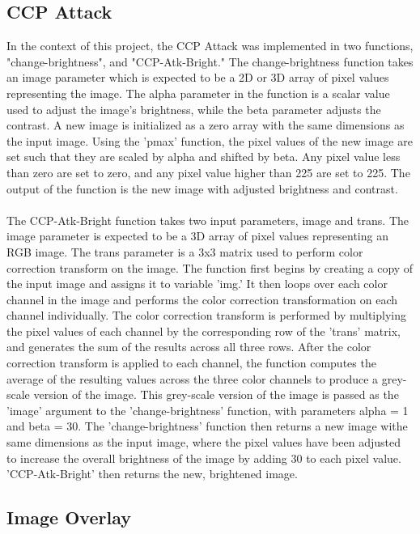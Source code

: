 \documentclass{article}
\begin{document}
\subsection{CCP Attack}
In the context of this project, the CCP Attack was implemented in two functions, "change-brightness", and "CCP-Atk-Bright." The change-brightness function takes an image parameter which is expected to be a 2D or 3D array of pixel values representing the image. The alpha parameter in the function is a scalar value used to adjust the image's brightness, while the beta parameter adjusts the contrast. A new image is initialized as a zero array with the same dimensions as the input image. Using the 'pmax' function, the pixel values of the new image are set such that they are scaled by alpha and shifted by beta. Any pixel value less than zero are set to zero, and any pixel value higher than 225 are set to 225. The output of the function is the new image with adjusted brightness and contrast.
\\
\\
The CCP-Atk-Bright function takes two input parameters, image and trans. The image parameter is expected to be a 3D array of pixel values representing an RGB image. The trans parameter is a 3x3 matrix used to perform color correction transform on the image. The function first begins by creating a copy of the input image and assigns it to variable 'img.' It then loops over each color channel in the image and performs the color correction transformation on each channel individually. The color correction transform is performed by multiplying the pixel values of each channel by the corresponding row of the 'trans' matrix, and generates the sum of the results across all three rows. After the color correction transform is applied to each channel, the function computes the average of the resulting values across the three color channels to produce a grey-scale version of the image. This grey-scale version of the image is passed as the 'image' argument to the 'change-brightness' function, with parameters alpha = 1 and beta = 30. The 'change-brightness' function then returns a new image withe same dimensions as the input image, where the pixel values have been adjusted to increase the overall brightness of the image by adding 30 to each pixel value. 'CCP-Atk-Bright' then returns the new, brightened image. 
\subsection{Image Overlay}
\end{document}
